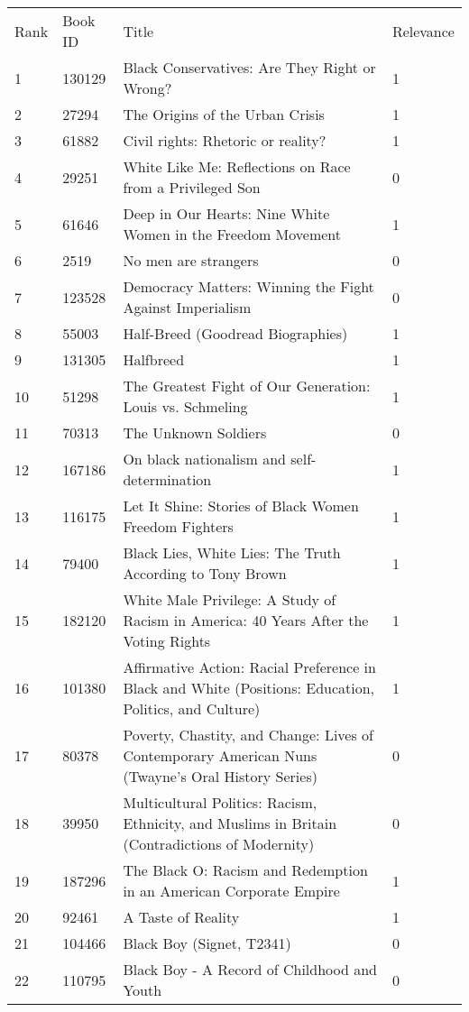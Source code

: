 \begin{tabular}{llll}
\toprule
\midrule
Rank & Book ID & Title & Relevance \\
1 & 130129 & Black Conservatives: Are They Right or Wrong? & 1 \\
2 & 27294 & The Origins of the Urban Crisis & 1 \\
3 & 61882 & Civil rights: Rhetoric or reality? & 1 \\
4 & 29251 & White Like Me: Reflections on Race from a Privileged Son & 0 \\
5 & 61646 & Deep in Our Hearts: Nine White Women in the Freedom Movement & 1 \\
6 & 2519 & No men are strangers & 0 \\
7 & 123528 & Democracy Matters: Winning the Fight Against Imperialism & 0 \\
8 & 55003 & Half-Breed (Goodread Biographies) & 1 \\
9 & 131305 & Halfbreed & 1 \\
10 & 51298 & The Greatest Fight of Our Generation: Louis vs. Schmeling & 1 \\
11 & 70313 & The Unknown Soldiers & 0 \\
12 & 167186 & On black nationalism and self-determination & 1 \\
13 & 116175 & Let It Shine: Stories of Black Women Freedom Fighters & 1 \\
14 & 79400 & Black Lies, White Lies: The Truth According to Tony Brown & 1 \\
15 & 182120 & White Male Privilege: A Study of Racism in America: 40 Years After the Voting Rights & 1 \\
16 & 101380 & Affirmative Action: Racial Preference in Black and White (Positions: Education, Politics, and Culture) & 1 \\
17 & 80378 & Poverty, Chastity, and Change: Lives of Contemporary American Nuns (Twayne's Oral History Series) & 0 \\
18 & 39950 & Multicultural Politics: Racism, Ethnicity, and Muslims in Britain (Contradictions of Modernity) & 0 \\
19 & 187296 & The Black O: Racism and Redemption in an American Corporate Empire & 1 \\
20 & 92461 & A Taste of Reality & 1 \\
21 & 104466 & Black Boy (Signet, T2341) & 0 \\
22 & 110795 & Black Boy - A Record of Childhood and Youth & 0 \\

\end{tabular}
